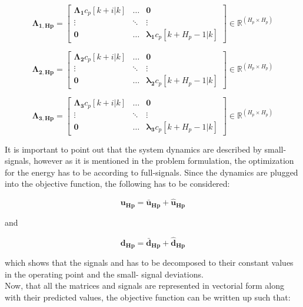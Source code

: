 \begin{equation}
\bm{\Lambda_{1,Hp}} =
 \begin{bmatrix}
 \bm{\Lambda_1} c_p[k+i|k] & \hdots & \bm{0} \\
 \vdots & \ddots & \vdots\\
 \bm{0} & \hdots & \bm{\lambda_1} c_p[k+H_p-1|k] 
 \end{bmatrix}
 \in \pmb{\mathbb{R}}^{(H_p \times H_p)}
\end{equation} 


\begin{equation}
\bm{\Lambda_{2,Hp}} =
 \begin{bmatrix}
 \bm{\Lambda_2} c_p[k+i|k] & \hdots & \bm{0} \\
 \vdots & \ddots & \vdots\\
 \bm{0} & \hdots & \bm{\lambda_2} c_p[k+H_p-1|k] 
 \end{bmatrix}
 \in \pmb{\mathbb{R}}^{(H_p \times H_p)}
\end{equation} 


\begin{equation}
\bm{\Lambda_{3,Hp}} =
 \begin{bmatrix}
 \bm{\Lambda_3} c_p[k+i|k] & \hdots & \bm{0} \\
 \vdots & \ddots & \vdots\\
 \bm{0} & \hdots & \bm{\lambda_3} c_p[k+H_p-1|k] 
 \end{bmatrix}
 \in \pmb{\mathbb{R}}^{(H_p \times H_p)}
\end{equation} 

It is important to point out that the system dynamics are described by small-signals, however as it is mentioned in the problem formulation, the optimization for the energy has to be according to full-signals. Since the dynamics are plugged into the objective function, the following has to be considered: 

\begin{equation}
\bm{u_{H{p}}} = \bm{\bar{u}_{H{p}}} + \bm{\hat{u}_{H{p}}}
\label{u_pred}
\end{equation}

and

\begin{equation}
\bm{d_{H{p}}} = \bm{\bar{d}_{H{p}}} + \bm{\hat{d}_{H{p}}}
\end{equation}

which shows that the signals and has to be decomposed to their constant values in the operating point and the small- signal deviations. 
\\
\newline
Now, that all the matrices and signals are represented in vectorial form along with their predicted values, the objective function can be written up such that:

